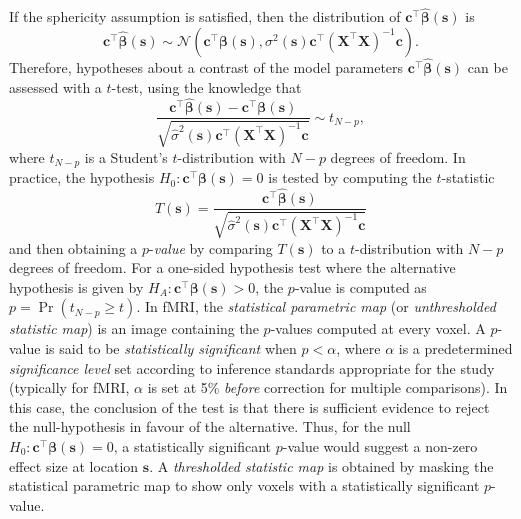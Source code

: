 If the sphericity assumption is satisfied, then the distribution of $\bm{c}^{\intercal}\bm{\hat{\beta}}(\bm{s})$ is 
\begin{equation}
\label{eq:contrast_distribution}
\bm{c}^{\intercal}\bm{\hat{\beta}}(\bm{s}) \sim \mathcal{N}(\bm{c}^{\intercal}\bm{\beta}(\bm{s}), \sigma^{2}(\bm{s})\bm{c}^{\intercal}(\bm{X}^{\intercal}\bm{X})^{-1}\bm{c}).
\end{equation}
Therefore, hypotheses about a contrast of the model parameters $\bm{c}^{\intercal}\bm{\hat{\beta}}(\bm{s})$ can be assessed with a $t$-test, using the knowledge that
\begin{equation}
\label{eq:contrast_minus_param_distribution}
\frac{\bm{c}^{\intercal}\bm{\hat{\beta}}(\bm{s}) - \bm{c}^{\intercal}\bm{\beta}(\bm{s})}{\sqrt{\hat{\sigma}^{2}(\bm{s})\bm{c}^{\intercal}(\bm{X}^{\intercal}\bm{X})^{-1}\bm{c}}} \sim t_{N-p},
\end{equation}
where $t_{N-p}$ is a  Student's $t$-distribution with $N-p$ degrees of freedom. In practice, the hypothesis $H_{0} : \bm{c}^{\intercal}\bm{\beta}(\bm{s}) = 0$ is tested by computing the $t$-statistic 
\begin{equation}
\label{eq:t_statistic}
T(\bm{s}) = \frac{\bm{c}^{\intercal}\bm{\hat{\beta}}(\bm{s})}{\sqrt{\hat{\sigma}^{2}(\bm{s})\bm{c}^{\intercal}(\bm{X}^{\intercal}\bm{X})^{-1}\bm{c}}}
\end{equation}
and then obtaining a $p$-\textit{value} by comparing $T(\bm{s})$ to a $t$-distribution with $N-p$ degrees of freedom. For a one-sided hypothesis test where the alternative hypothesis is given by $H_{A} : \bm{c}^{\intercal}\bm{\beta}(\bm{s}) > 0$, the $p$-value is computed as $p = \Pr(t_{N-p} \geq t)$. In fMRI, the \textit{statistical parametric map} (or \textit{unthresholded statistic map}) is an image containing the $p$-values computed at every voxel. A $p$-value is said to be \textit{statistically significant} when $p < \alpha$, where $\alpha$ is a predetermined \textit{significance level} set according to inference standards appropriate for the study (typically for fMRI, $\alpha$ is set at 5\% \textit{before} correction for multiple comparisons). In this case, the conclusion of the test is that there is sufficient evidence to reject the null-hypothesis in favour of the alternative. Thus, for the null $H_{0} : \bm{c}^{\intercal}\bm{\beta}(\bm{s}) = 0$, a statistically significant $p$-value would suggest a non-zero effect size at location $\bm{s}$. A \textit{thresholded statistic map} is obtained by masking the statistical parametric map to show only voxels with a statistically significant $p$-value. 

